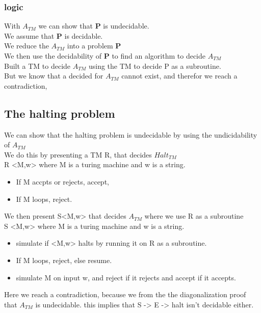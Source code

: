 \documentclass[a4paper,10pt,titlepage]{report}
\begin{document}
\subsubsection{logic} 
With $A_{TM}$ we can show that \textbf{P} is undecidable.\\

We assume that \textbf{P} is decidable.\\
We reduce the $ A_{TM} $ into a problem \textbf{P}\\

We then use the decidability of \textbf{P} to find an algorithm to decide $ A_{TM} $\\
Built a TM to decide $A_{TM}$ using the TM to decide P as a subroutine.\\
But we know that a decided for $A_{TM}$ cannot exist, and therefor we reach a contradiction,



\subsection{The halting problem}

We can show that the halting problem is undecidable by using the undicidability of $A_{TM}$\\

We do this by presenting a TM R, that decides $Halt_{TM}$\\

R <M,w> where M is a turing machine and w is a string.
\begin{itemize}
	\item If M accpts or rejects, accept,
	\item If M loops, reject.
\end{itemize}


We then present S<M,w> that decides $A_{TM}$ where we use R as a subroutine\\

S <M,w> where M is a turing machine and w is a string.
\begin{itemize}
	\item simulate if <M,w> halts by running it on R as a subroutine. 
	\item If M loops, reject, else resume.
	\item simulate M on input w, and reject if it rejects and accept if it accepts.
\end{itemize}

Here we reach a contradiction, because we from the the diagonalization proof that $A_{TM}$ is undecidable. this implies that S -> E -> halt isn't decidable either.
\end{document}
